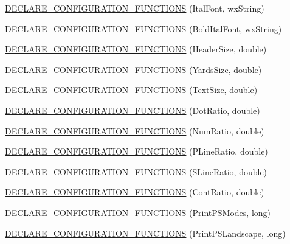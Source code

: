 \begin{DoxyCompactItemize}
\item 
\hyperlink{a00191_aabb69d6e673d078d1363ef01e9a81258}{D\-E\-C\-L\-A\-R\-E\-\_\-\-C\-O\-N\-F\-I\-G\-U\-R\-A\-T\-I\-O\-N\-\_\-\-F\-U\-N\-C\-T\-I\-O\-N\-S} (Ital\-Font, wx\-String)
\item 
\hyperlink{a00191_ad59ba1c3324b6890e861eacb03a0e0f8}{D\-E\-C\-L\-A\-R\-E\-\_\-\-C\-O\-N\-F\-I\-G\-U\-R\-A\-T\-I\-O\-N\-\_\-\-F\-U\-N\-C\-T\-I\-O\-N\-S} (Bold\-Ital\-Font, wx\-String)
\item 
\hyperlink{a00191_a6dda862d2318200677647ce8131fccda}{D\-E\-C\-L\-A\-R\-E\-\_\-\-C\-O\-N\-F\-I\-G\-U\-R\-A\-T\-I\-O\-N\-\_\-\-F\-U\-N\-C\-T\-I\-O\-N\-S} (Header\-Size, double)
\item 
\hyperlink{a00191_aba7f8b3c45939ee0dac98a83076b3823}{D\-E\-C\-L\-A\-R\-E\-\_\-\-C\-O\-N\-F\-I\-G\-U\-R\-A\-T\-I\-O\-N\-\_\-\-F\-U\-N\-C\-T\-I\-O\-N\-S} (Yards\-Size, double)
\item 
\hyperlink{a00191_aa6f244040ae49ce9dde31f472b80ab98}{D\-E\-C\-L\-A\-R\-E\-\_\-\-C\-O\-N\-F\-I\-G\-U\-R\-A\-T\-I\-O\-N\-\_\-\-F\-U\-N\-C\-T\-I\-O\-N\-S} (Text\-Size, double)
\item 
\hyperlink{a00191_aca44de25fef694024e19ace9648c6024}{D\-E\-C\-L\-A\-R\-E\-\_\-\-C\-O\-N\-F\-I\-G\-U\-R\-A\-T\-I\-O\-N\-\_\-\-F\-U\-N\-C\-T\-I\-O\-N\-S} (Dot\-Ratio, double)
\item 
\hyperlink{a00191_a09fa5b23b3813ec71ef1805e38079c00}{D\-E\-C\-L\-A\-R\-E\-\_\-\-C\-O\-N\-F\-I\-G\-U\-R\-A\-T\-I\-O\-N\-\_\-\-F\-U\-N\-C\-T\-I\-O\-N\-S} (Num\-Ratio, double)
\item 
\hyperlink{a00191_a90df16b506f0bf04e89c9558b9918611}{D\-E\-C\-L\-A\-R\-E\-\_\-\-C\-O\-N\-F\-I\-G\-U\-R\-A\-T\-I\-O\-N\-\_\-\-F\-U\-N\-C\-T\-I\-O\-N\-S} (P\-Line\-Ratio, double)
\item 
\hyperlink{a00191_a84147685f1366692b9bbe68736073eed}{D\-E\-C\-L\-A\-R\-E\-\_\-\-C\-O\-N\-F\-I\-G\-U\-R\-A\-T\-I\-O\-N\-\_\-\-F\-U\-N\-C\-T\-I\-O\-N\-S} (S\-Line\-Ratio, double)
\item 
\hyperlink{a00191_a63d1b74d5e9d360b8a4353f89b329414}{D\-E\-C\-L\-A\-R\-E\-\_\-\-C\-O\-N\-F\-I\-G\-U\-R\-A\-T\-I\-O\-N\-\_\-\-F\-U\-N\-C\-T\-I\-O\-N\-S} (Cont\-Ratio, double)
\item 
\hyperlink{a00191_af61640323cf9e82a09e0797ece30e0be}{D\-E\-C\-L\-A\-R\-E\-\_\-\-C\-O\-N\-F\-I\-G\-U\-R\-A\-T\-I\-O\-N\-\_\-\-F\-U\-N\-C\-T\-I\-O\-N\-S} (Print\-P\-S\-Modes, long)
\item 
\hyperlink{a00191_a2b94275b62dbf3f45c51d4345df54b63}{D\-E\-C\-L\-A\-R\-E\-\_\-\-C\-O\-N\-F\-I\-G\-U\-R\-A\-T\-I\-O\-N\-\_\-\-F\-U\-N\-C\-T\-I\-O\-N\-S} (Print\-P\-S\-Landscape, long)

\end{DoxyCompactItemize}
